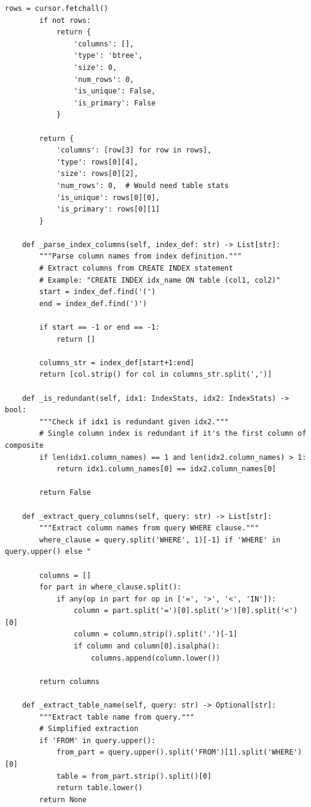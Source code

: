 \begin{lstlisting}[style=python, caption=IndexManager with Smart Recommendations]
        rows = cursor.fetchall()
        if not rows:
            return {
                'columns': [],
                'type': 'btree',
                'size': 0,
                'num_rows': 0,
                'is_unique': False,
                'is_primary': False
            }

        return {
            'columns': [row[3] for row in rows],
            'type': rows[0][4],
            'size': rows[0][2],
            'num_rows': 0,  # Would need table stats
            'is_unique': rows[0][0],
            'is_primary': rows[0][1]
        }

    def _parse_index_columns(self, index_def: str) -> List[str]:
        """Parse column names from index definition."""
        # Extract columns from CREATE INDEX statement
        # Example: "CREATE INDEX idx_name ON table (col1, col2)"
        start = index_def.find('(')
        end = index_def.find(')')

        if start == -1 or end == -1:
            return []

        columns_str = index_def[start+1:end]
        return [col.strip() for col in columns_str.split(',')]

    def _is_redundant(self, idx1: IndexStats, idx2: IndexStats) -> bool:
        """Check if idx1 is redundant given idx2."""
        # Single column index is redundant if it's the first column of composite
        if len(idx1.column_names) == 1 and len(idx2.column_names) > 1:
            return idx1.column_names[0] == idx2.column_names[0]

        return False

    def _extract_query_columns(self, query: str) -> List[str]:
        """Extract column names from query WHERE clause."""
        where_clause = query.split('WHERE', 1)[-1] if 'WHERE' in query.upper() else "

        columns = []
        for part in where_clause.split():
            if any(op in part for op in ['=', '>', '<', 'IN']):
                column = part.split('=')[0].split('>')[0].split('<')[0]
                column = column.strip().split('.')[-1]
                if column and column[0].isalpha():
                    columns.append(column.lower())

        return columns

    def _extract_table_name(self, query: str) -> Optional[str]:
        """Extract table name from query."""
        # Simplified extraction
        if 'FROM' in query.upper():
            from_part = query.upper().split('FROM')[1].split('WHERE')[0]
            table = from_part.strip().split()[0]
            return table.lower()
        return None


\end{lstlisting}
